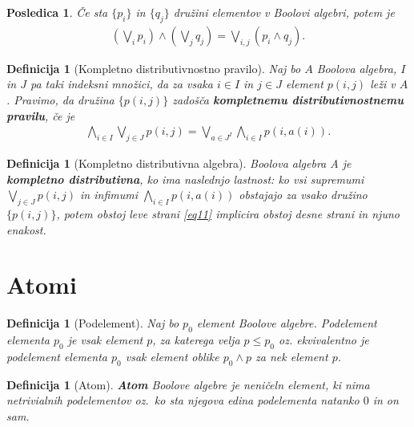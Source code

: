 \documentclass{amsart}
\newtheorem{posledica}[izrek]{Posledica}
\newtheorem{definicija}[izrek]{Definicija}
\begin{document}
\begin{posledica}
    Če sta \(\{p_i\}\) in \(\{q_j\}\) družini elementov v Boolovi algebri, potem je 
    \begin{align*}
        \left(\bigvee_i p_i \right) \wedge \left(\bigvee_j q_j \right)=
        \bigvee_{i, j} \left(p_i \wedge q_j\right). 
    \end{align*}
\end{posledica}

\begin{definicija}[Kompletno distributivnostno pravilo]
    Naj bo \(A\) Boolova algebra, $I$ in $J$ pa taki indeksni množici, da za vsaka \(i \in I\) in \(j \in J\) 
    element \(p(i, j)\) leži v $A$. Pravimo, da družina \(\{p(i, j)\}\) zadošča {\bf kompletnemu distributivnostnemu pravilu}, če je 
    \begin{align}
        \label{eq11} \bigwedge_{i \in I} \bigvee_{j \in J} p(i, j) = \bigvee_{a \in J^{I}} \bigwedge_{i \in I} p(i, a(i)).
    \end{align}
\end{definicija}


\begin{definicija}[Kompletno distributivna algebra]
    Boolova algebra A je {\bf kompletno distributivna}, ko ima naslednjo lastnost:
    ko vsi supremumi \(\bigvee_{j \in J} p(i, j)\) in infimumi \(\bigwedge_{i \in I} p(i, a(i))\) obstajajo za vsako družino
    \(\{p(i, j)\}\), potem obstoj leve strani \eqref{eq11} implicira obstoj desne strani in njuno enakost.
\end{definicija}


\section{Atomi}

\begin{definicija}[Podelement]
    Naj bo $p_0$ element Boolove algebre. Podelement elementa $p_0$ je vsak element
    \(p\), za katerega velja \(p \leq p_0\) oz. ekvivalentno je podelement elementa $p_0$ vsak element oblike
    \(p_0 \wedge p\) za nek element \(p\).
\end{definicija}

\begin{definicija}[Atom]
    {\bf Atom} Boolove algebre je neničeln element, ki nima netrivialnih podelementov oz.\ ko sta njegova edina podelementa natanko $0$ in on sam.
\end{definicija}
\end{document}
